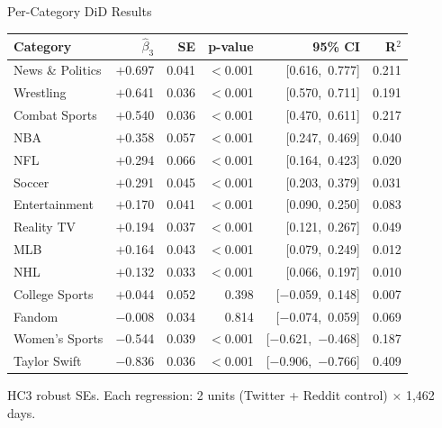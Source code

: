 \documentclass[aspectratio=169,t]{beamer}
\begin{document}
\begin{frame}{Per-Category DiD Results}
\vspace{0.2em}
\begin{center}
\scriptsize
\setlength{\tabcolsep}{5pt}
\renewcommand{\arraystretch}{0.9}
\begin{tabular}{lrrrrr}
\toprule
\textbf{Category} & \textbf{$\hat{\beta}_3$} & \textbf{SE} & \textbf{p-value} & \textbf{95\% CI} & \textbf{R$^2$} \\
\midrule
\textcolor{uteporange}{News \& Politics}   & $+$0.697 & 0.041 & $<$0.001 & [0.616,\ 0.777] & 0.211 \\
\textcolor{uteporange}{Wrestling}          & $+$0.641 & 0.036 & $<$0.001 & [0.570,\ 0.711] & 0.191 \\
\textcolor{uteporange}{Combat Sports}      & $+$0.540 & 0.036 & $<$0.001 & [0.470,\ 0.611] & 0.217 \\
\textcolor{uteporange}{NBA}                & $+$0.358 & 0.057 & $<$0.001 & [0.247,\ 0.469] & 0.040 \\
\textcolor{uteporange}{NFL}                & $+$0.294 & 0.066 & $<$0.001 & [0.164,\ 0.423] & 0.020 \\
\textcolor{uteporange}{Soccer}             & $+$0.291 & 0.045 & $<$0.001 & [0.203,\ 0.379] & 0.031 \\
\textcolor{uteporange}{Entertainment}      & $+$0.170 & 0.041 & $<$0.001 & [0.090,\ 0.250] & 0.083 \\
\textcolor{uteporange}{Reality TV}         & $+$0.194 & 0.037 & $<$0.001 & [0.121,\ 0.267] & 0.049 \\
\textcolor{uteporange}{MLB}                & $+$0.164 & 0.043 & $<$0.001 & [0.079,\ 0.249] & 0.012 \\
\textcolor{uteporange}{NHL}                & $+$0.132 & 0.033 & $<$0.001 & [0.066,\ 0.197] & 0.010 \\
\textcolor{utepsilver}{College Sports}     & $+$0.044 & 0.052 & 0.398    & [$-$0.059,\ 0.148] & 0.007 \\
\textcolor{utepsilver}{Fandom}             & $-$0.008 & 0.034 & 0.814    & [$-$0.074,\ 0.059] & 0.069 \\
\textcolor{utepblue}{Women's Sports}       & $-$0.544 & 0.039 & $<$0.001 & [$-$0.621,\ $-$0.468] & 0.187 \\
\textcolor{utepblue}{Taylor Swift}         & $-$0.836 & 0.036 & $<$0.001 & [$-$0.906,\ $-$0.766] & 0.409 \\
\bottomrule
\end{tabular}

\vspace{0.3em}
{\scriptsize\textcolor{utepsilver}{HC3 robust SEs. Each regression: 2 units (Twitter + Reddit control) $\times$ 1,462 days.}}
\end{center}
\end{frame}
\end{document}
